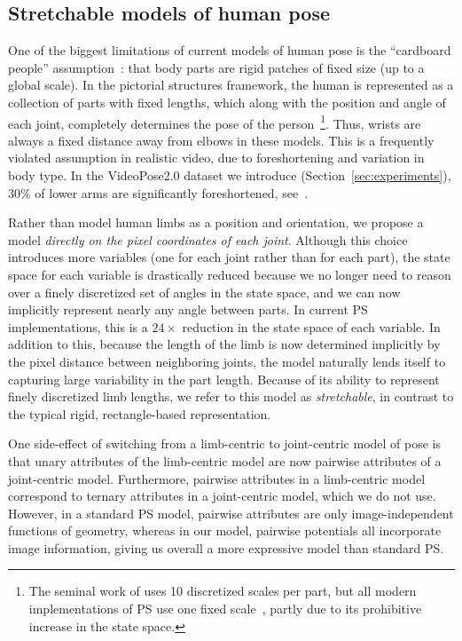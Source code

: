 \subsection{Stretchable models of human pose}  One of the biggest limitations 
of current models of human pose is the ``cardboard people'' 
assumption~\citep{cardboard02}: that body parts are rigid patches of fixed size 
(up to a global scale).  In the pictorial structures framework, the human is 
represented as a collection of parts with fixed lengths, which along with the 
position and angle of each joint, completely determines the pose of the 
person~\footnote{The seminal work of \citet{felz05} uses 10 discretized scales 
per part, but all modern implementations of PS use one fixed 
scale~\citep{sapp2010cascades,ferrari08,andriluka09}, partly due to its 
prohibitive increase in the state space.}.  Thus, wrists are always a fixed 
distance away from elbows in these models. This is a frequently violated 
assumption in realistic video, due to foreshortening and variation in body 
type.  In the VideoPose2.0 dataset we  introduce 
(Section~\ref{sec:experiments}), 30\% of lower arms are significantly 
foreshortened, see~.

 Rather than model human limbs as a position 
and orientation, we propose a model {\em directly on the pixel coordinates of 
each joint}.  Although this choice introduces more variables 
(one for each joint rather than for each part), the state space for each 
variable is drastically reduced because we no longer need to reason over a 
finely discretized set of angles in the state space, and we can now implicitly 
represent nearly any angle between parts.  In current PS implementations, this is a 
$24\times$ reduction in the state space of each variable.  In addition to 
this, because the length of the limb is now determined implicitly by the pixel 
distance between neighboring joints, the model naturally lends itself to 
capturing large variability in the part length.  Because of its ability to 
represent finely discretized limb lengths, we refer to this model as
{\em stretchable}, in contrast to the typical rigid, rectangle-based 
representation.

One side-effect of switching from a limb-centric to joint-centric model of 
pose is that unary attributes of the limb-centric model are now pairwise 
attributes of a joint-centric model.  Furthermore, pairwise attributes in a 
limb-centric model correspond to ternary attributes in a joint-centric model, 
which we do not use.  However, in a standard PS model, pairwise attributes are 
only image-independent functions of geometry, whereas in our model, pairwise 
potentials all incorporate image information, giving us overall a more 
expressive model than standard PS. 



